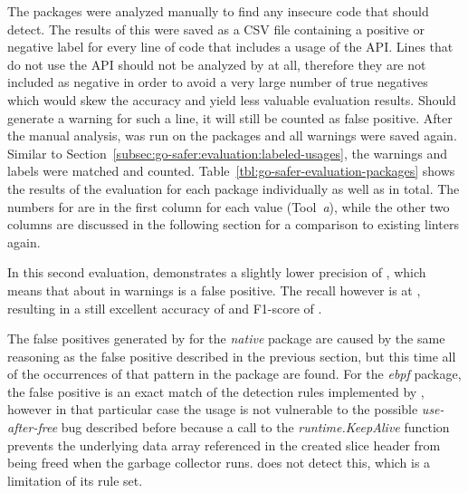 

The  packages were analyzed manually to find any insecure code that \toolSafer{} should detect.
The results of this were saved as a \acrshort{CSV} file containing a positive or negative label for every line of code
that includes a usage of the \unsafe{} \acrshort{API}.
Lines that do not use the \acrshort{API} should not be analyzed by \toolSafer{} at all, therefore they are not included
as negative in order to avoid a very large number of true negatives which would skew the accuracy and yield less
valuable evaluation results.
Should \toolSafer{} generate a warning for such a line, it will still be counted as false positive.
After the manual analysis, \toolSafer{} was run on the packages and all warnings were saved again.
Similar to Section~\ref{subsec:go-safer:evaluation:labeled-usages}, the warnings and labels were matched and counted.
Table~\ref{tbl:go-safer-evaluation-packages} shows the results of the evaluation for each package individually as well
as in total.
The numbers for \toolSafer{} are in the first column for each value (Tool~\textit{a}), while the other two columns are
discussed in the following section for a comparison to existing linters again.



In this second evaluation, \toolSafer{} demonstrates a slightly lower precision of , which means that
about  in  warnings is a false positive.
The recall however is at , resulting in a still excellent accuracy of  and F1-score of
.

The false positives generated by \toolSafer{} for the \textit{native} package are caused by the same reasoning as the
false positive described in the previous section, but this time all of the occurrences of that pattern in the package
are found.
For the \textit{ebpf} package, the false positive is an exact match of the detection rules implemented by \toolSafer{},
however in that particular case the usage is not vulnerable to the possible \textit{use-after-free} bug described before
because a call to the \textit{runtime.KeepAlive} function prevents the underlying data array referenced in the created
slice header from being freed when the garbage collector runs.
\toolSafer{} does not detect this, which is a limitation of its rule set.


